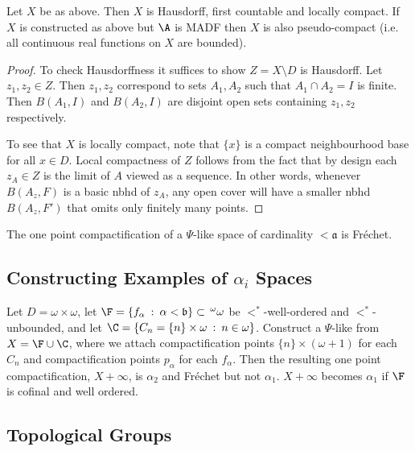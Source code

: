 \documentclass{article}
\begin{document}
\begin{prop}
    Let \(X\) be as above. Then \(X\) is Hausdorff, first countable and locally compact. If \(X\) is constructed as above but \(\A\) is MADF then \(X\) is also pseudo-compact (i.e. all continuous real functions on \(X\) are bounded).
\end{prop}

\begin{proof}
    To check Hausdorffness it suffices to show \(Z = X\setminus D\) is Hausdorff. Let \(z_1, z_2 \in Z\). Then \(z_1, z_2\) correspond to sets \(A_1, A_2\) such that \(A_1 \cap A_2 = I\) is finite. Then \(B(A_1, I)\) and \(B(A_2, I)\) are disjoint open sets containing \(z_1, z_2\) respectively. 

    To see that \(X\) is locally compact, note that \(\{x\}\) is a compact neighbourhood base for all \(x \in D\). Local compactness of \(Z\) follows from the fact that by design each \(z_A \in Z\) is the limit of \(A\) viewed as a sequence. In other words, whenever \(B(A_z, F)\) is a basic nbhd of \(z_A\), any open cover will have a smaller nbhd \(B(A_z, F')\) that omits only finitely many points.
\end{proof}

\begin{prop}
    The one point compactification of a \(\Psi\)-like space of cardinality \(<\mathfrak{a}\) is Fréchet. 
\end{prop}

\subsection{Constructing Examples of \(\alpha_i\) Spaces}

\begin{exam}
     Let \(D = \omega\times\omega\), let \(\F = \{f_{\alpha} \: : \: \alpha < \mathfrak{b}\} \subset \, ^\omega\omega\) be \(<^{\ast}\)-well-ordered and \(<^{\ast}\)-unbounded, and let \(\C = \{C_n = \{n\} \times \omega \: : \: n \in \omega\}\). Construct a \(\Psi\)-like from \(X = \F \cup \C\), where we attach compactification points \(\{n\} \times (\omega+1)\) for each \(C_n\) and compactification points \(p_{\alpha}\) for each \(f_{\alpha}\). Then the resulting one point compactification, \(X + \infty\), is \(\alpha_2\) and Fréchet but not \(\alpha_1\). \(X + \infty\) becomes \(\alpha_1\) if \(\F\) is cofinal and well ordered. 
\end{exam}

\subsection{Topological Groups}
\end{document}
